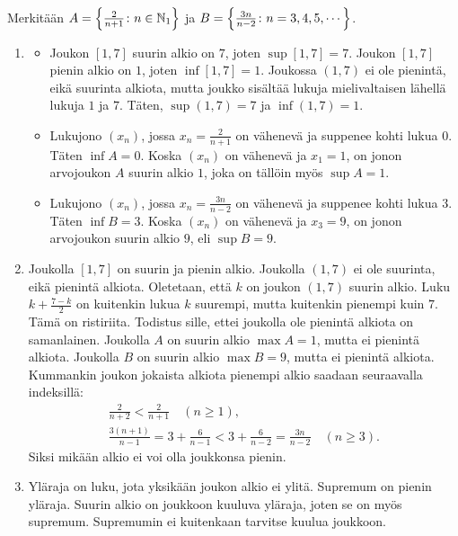 \documentclass[11pt,a4paper]{amsart}
\begin{document}
\begin{solution}
Merkitään \(A = \left\lbrace\frac{2}{n + 1}\colon n \in \mathbb{N}_1\right\rbrace\) ja
\(B = \left\lbrace\frac{3n}{n - 2} \colon n = 3,4,5,\cdots\right\rbrace\).
\begin{enumerate}[label=\alph*), nosep]
\item
  \begin{itemize}[nosep]
    \item Joukon \([1, 7]\) suurin alkio on \(7\), joten \(\sup{[1, 7]} = 7\).
      Joukon \([1, 7]\) pienin alkio on \(1\), joten \(\inf{[1, 7]} = 1\).
      Joukossa \((1, 7)\) ei ole pienintä, eikä suurinta alkiota, mutta joukko
      sisältää lukuja mielivaltaisen lähellä lukuja \(1\) ja \(7\). Täten,
      \(\sup{(1, 7)} = 7\) ja \(\inf{(1, 7)} = 1\).
    \item Lukujono \((x_n)\), jossa \(x_n = \frac{2}{n + 1}\) on vähenevä ja
      suppenee kohti lukua \(0\). Täten
      \(\inf{A} = 0\). Koska \((x_n)\) on
      vähenevä ja \(x_1 = 1\), on jonon arvojoukon \(A\) suurin alkio \(1\),
      joka on tällöin myös \(\sup{A} = 1\).
    \item Lukujono \((x_n)\), jossa \(x_n = \frac{3n}{n - 2}\) on vähenevä ja
      suppenee kohti lukua \(3\). Täten \(\inf{B} = 3\). Koska \((x_n)\)
      on vähenevä ja \(x_3 = 9\), on jonon arvojoukon suurin alkio \(9\),
      eli \(\sup{B} = 9\).
  \end{itemize}
\item Joukolla \([1, 7]\) on suurin ja pienin alkio. Joukolla \((1, 7)\) ei ole
  suurinta, eikä pienintä alkiota. Oletetaan, että \(k\) on joukon
  \((1, 7)\) suurin alkio. Luku \(k + \frac{7 - k}{2}\) on kuitenkin lukua \(k\)
  suurempi, mutta kuitenkin pienempi kuin \(7\). Tämä on ristiriita.
  Todistus sille, ettei joukolla ole pienintä alkiota on samanlainen.
  Joukolla \(A\) on suurin alkio \(\max{A} = 1\), mutta ei pienintä alkiota.
  Joukolla \(B\) on suurin alkio \(\max{B} = 9\), mutta ei pienintä alkiota.
  Kummankin joukon jokaista alkiota pienempi alkio saadaan
  seuraavalla indeksillä:
  \begin{gather*}
    \frac{2}{n+2}<\frac{2}{n+1}\quad(n\ge1),\\[0.5em]
    \frac{3(n+1)}{n-1}=3+\frac{6}{n-1}
    <3+\frac{6}{n-2}=\frac{3n}{n-2}\quad(n\ge3).
  \end{gather*}
  Siksi mikään alkio ei voi olla joukkonsa pienin.
\item Yläraja on luku, jota yksikään joukon alkio ei ylitä.
  Supremum on pienin yläraja. Suurin alkio on joukkoon kuuluva yläraja,
  joten se on myös supremum. Supremumin ei kuitenkaan tarvitse kuulua joukkoon.

\end{enumerate}
\end{solution}
\end{document}

